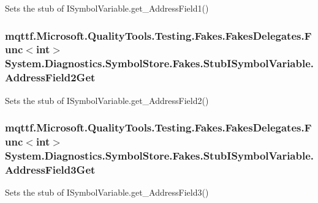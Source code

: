Sets the stub of I\-Symbol\-Variable.\-get\-\_\-\-Address\-Field1()

\hypertarget{class_system_1_1_diagnostics_1_1_symbol_store_1_1_fakes_1_1_stub_i_symbol_variable_ab391d878ffdcc3be409241e42ae36531}{
\subsubsection[{Address\-Field2\-Get}]{\setlength{\rightskip}{0pt plus 5cm}mqttf.\-Microsoft.\-Quality\-Tools.\-Testing.\-Fakes.\-Fakes\-Delegates.\-Func$<$int$>$ System.\-Diagnostics.\-Symbol\-Store.\-Fakes.\-Stub\-I\-Symbol\-Variable.\-Address\-Field2\-Get}}\label{class_system_1_1_diagnostics_1_1_symbol_store_1_1_fakes_1_1_stub_i_symbol_variable_ab391d878ffdcc3be409241e42ae36531}


Sets the stub of I\-Symbol\-Variable.\-get\-\_\-\-Address\-Field2()

\hypertarget{class_system_1_1_diagnostics_1_1_symbol_store_1_1_fakes_1_1_stub_i_symbol_variable_aecd98f918820b84bcb7765e32354da8e}{
\subsubsection[{Address\-Field3\-Get}]{\setlength{\rightskip}{0pt plus 5cm}mqttf.\-Microsoft.\-Quality\-Tools.\-Testing.\-Fakes.\-Fakes\-Delegates.\-Func$<$int$>$ System.\-Diagnostics.\-Symbol\-Store.\-Fakes.\-Stub\-I\-Symbol\-Variable.\-Address\-Field3\-Get}}\label{class_system_1_1_diagnostics_1_1_symbol_store_1_1_fakes_1_1_stub_i_symbol_variable_aecd98f918820b84bcb7765e32354da8e}


Sets the stub of I\-Symbol\-Variable.\-get\-\_\-\-Address\-Field3()

